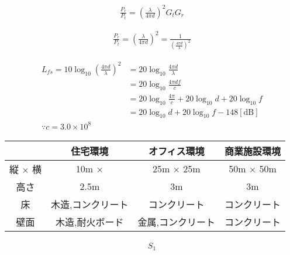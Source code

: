 \documentclass{ltjsarticle}
\begin{document}
\begin{align*}
  \frac{P_r}{P_t} = \left(\frac{\lambda}{4 \pi d}\right)^2 G_t G_r
\end{align*}

\begin{align*}
  \frac{P_r}{P_t} = \left(\frac{\lambda}{4 \pi d}\right)^2 = \frac{1}{\left(\frac{4 \pi d}{\lambda}\right)^2}
\end{align*}

\begin{align*}
  L_{fs} = 10 \log_{10} \left(\frac{4 \pi d}{\lambda}\right)^2 &= 20 \log_{10} \frac{4 \pi d}{\lambda} \\
  &= 20 \log_{10} \frac{4 \pi d f}{c}\\
  &= 20 \log_{10} \frac{4 \pi}{c} + 20 \log_{10} d + 20 \log_{10} f\\
  &= 20 \log_{10} d + 20 \log_{10} f - 148 [\mathrm{dB}]\\
  \because c = 3.0 \times 10^8
\end{align*}

\begin{tabular}{|c|c|c|c|}\hline
      & 住宅環境 & オフィス環境 & 商業施設環境 \\ \hline
  縦 $\times$ 横  & 10m $\times$ & 25m $\times$ 25m & 50m $\times$ 50m \\ \hline
  高さ & 2.5m & 3m & 3m \\ \hline
  床 & 木造,コンクリート & コンクリート & コンクリート \\ \hline
  壁面 & 木造,耐火ボード & 金属,コンクリート & コンクリート \\ \hline
\end{tabular}

\begin{align*}
  S_1
\end{align*}

\end{document}
